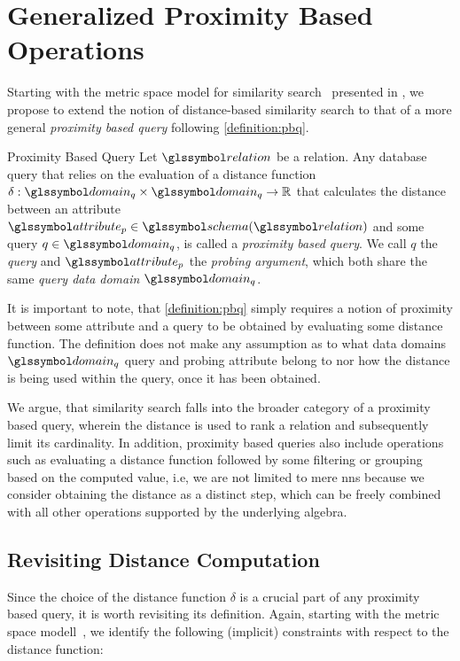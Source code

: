 \section{Generalized Proximity Based Operations}

Starting with the metric space model for similarity search~\cite{Zezula:2006similarity} presented in , we propose to extend the notion of distance-based similarity search to that of a more general \emph{proximity based query} following \cref{definition:pbq}.

\begin{definition}[label=definition:pbq]{Proximity Based Query}{}
    Let $\relation$ be a relation. Any database query that relies on the evaluation of a distance function $\delta: \domain_q \times \domain_q \rightarrow \mathbb{R}$ that calculates the distance between an attribute $\attribute_{p} \in \schema(\relation)$ and some query $q \in \domain_q$, is called a \emph{proximity based query}. We call $q$ the \emph{query} and $\attribute_{p}$ the \emph{probing argument}, which both share the same \emph{query data domain} $\domain_q$.
\end{definition}

It is important to note, that \cref{definition:pbq} simply requires a notion of proximity between some attribute and a query to be obtained by evaluating some distance function. The definition does not make any assumption as to what data domains $\domain_q$ query and probing attribute belong to nor how the distance is being used within the query, once it has been obtained. 

We argue, that similarity search falls into the broader category of a proximity based query, wherein the distance is used to rank a relation and subsequently limit its cardinality. In addition, proximity based queries also include operations such as evaluating a distance function followed by some filtering or grouping based on the computed value, i.e, we are not limited to mere \acrshort{nns} because we consider obtaining the distance as a distinct step, which can be freely combined with all other operations supported by the underlying algebra.

\subsection{Revisiting Distance Computation}

Since the choice of the distance function $\delta$ is a crucial part of any proximity based query, it is worth revisiting its definition. Again, starting with the metric space modell~\cite{Zezula:2006similarity}, we identify the following (implicit) constraints with respect to the distance function:

